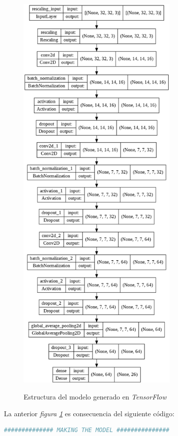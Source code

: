 \begin{appendices}
\begin{figure}[]
    \centering
    \includegraphics[width=0.7\textwidth]{capturas/estructuraRNTF.png}\\[-0,35cm]
    \caption{Estructura del modelo generado en \textit{TensorFlow}\label{estRN}}
\end{figure}

La anterior \textit{figura \ref{estRN}} es consecuencia del siguiente código:
\begin{lstlisting}[language=python, title=Fragmento de \textit{Train.ipynb}]
    ############## MAKING THE MODEL ###############


\end{lstlisting}
\end{appendices}
